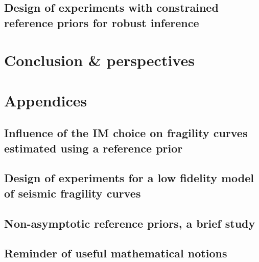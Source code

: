 \documentclass[a4paper]{book}
\begin{document}



\chapter{Design of experiments with constrained reference priors for robust inference%
}\label{chap:doe}






\part{Conclusion \& perspectives}\label{part:conclusion}





\appendix
\part*{Appendices}\label{part:appendix}


\chapter{Influence of the IM choice on fragility curves estimated using a reference prior}\label{app:chap:uncecomp}



\chapter{Design of experiments for a low fidelity model of seismic fragility curves}\label{app:chap:ESAIM}




\chapter{Non-asymptotic reference priors, a brief study}




\chapter{Reminder of useful mathematical notions}
\end{document}
